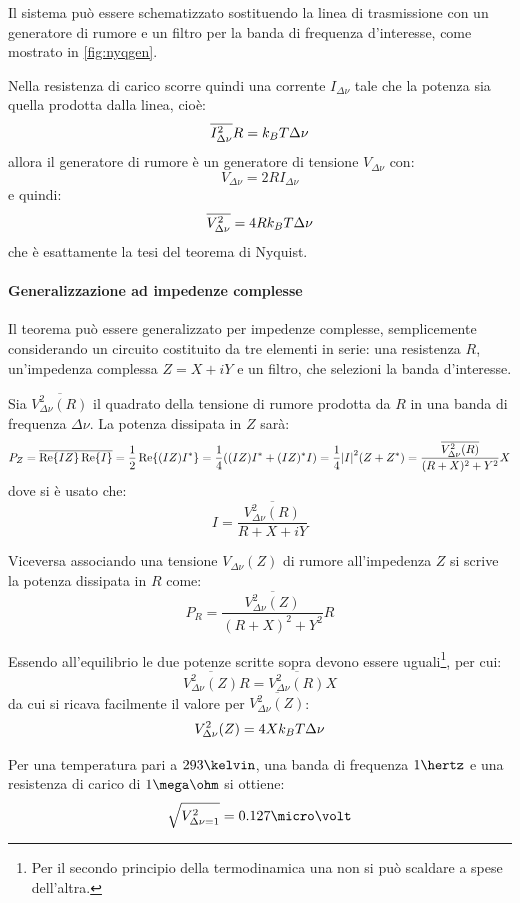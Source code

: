 Il sistema può essere schematizzato sostituendo la linea di trasmissione con un generatore di rumore e un filtro per la banda di frequenza d'interesse, come mostrato in \cref{fig:nyqgen}.

Nella resistenza di carico scorre quindi una corrente $ I_{\Delta\nu} $ tale che la potenza sia quella prodotta dalla linea, cioè:
\[ \overline{I_{\Delta\nu}^2} R = k_B T \Delta\nu \]
allora il generatore di rumore è un generatore di tensione $ V_{\Delta\nu} $ con:
\[ V_{\Delta\nu} = 2 R I_{\Delta\nu} \]
e quindi:
\[ \overline{V_{\Delta\nu}^2} = 4 R k_B T \Delta\nu \]
che è esattamente la tesi del teorema di Nyquist.

\paragraph{Generalizzazione ad impedenze complesse} Il teorema può essere generalizzato per impedenze complesse, semplicemente considerando un circuito costituito da tre elementi in serie: una resistenza $ R $, un'impedenza complessa $ Z = X + i Y $ e un filtro, che selezioni la banda d'interesse.

Sia $ \overline{V_{\Delta\nu}^2(R)} $ il quadrato della tensione di rumore prodotta da $ R $ in una banda di frequenza $ \Delta\nu $. La potenza dissipata in $ Z $ sarà:
\[ P_Z = \overline{\Re\{IZ\} \Re\{I\}} = \frac{1}{2} \Re\{(IZ) I^\ast\} = \frac{1}{4} ((IZ) I^\ast + (IZ)^\ast I) = \frac{1}{4}\abs{I}^2 (Z + Z^\ast) = \frac{\overline{V_{\Delta\nu}^2(R)}}{(R+X)^2 + Y^2}X\]
dove si è usato che:
\[ I = \frac{\overline{V_{\Delta\nu}^2(R)}}{R + X +iY} \]

Viceversa associando una tensione $ V_{\Delta\nu}(Z) $ di rumore all'impedenza $ Z $ si scrive la potenza dissipata in $ R $ come:
\[  P_R = \frac{\overline{V_{\Delta\nu}^2(Z)}}{(R+X)^2 + Y^2}R \]

Essendo all'equilibrio le due potenze scritte sopra devono essere uguali\footnote{Per il secondo principio della termodinamica una non si può scaldare a spese dell'altra.}, per cui:
\[ \overline{V_{\Delta\nu}^2(Z)} R = \overline{V_{\Delta\nu}^2(R)} X \]
da cui si ricava facilmente il valore per $ \overline{V_{\Delta\nu}^2(Z)} $:
\[ V_{\Delta\nu}^2(Z) = 4 X k_B T \Delta\nu\]

\begin{es}
	Per una temperatura pari a $ 293 \kelvin $, una banda di frequenza $ 1 \hertz $ e una resistenza di carico di $ 1 \mega\ohm $ si ottiene:
	\[ \sqrt{V_{\Delta\nu = 1}^2} = 0.127 \micro\volt \]
\end{es}

